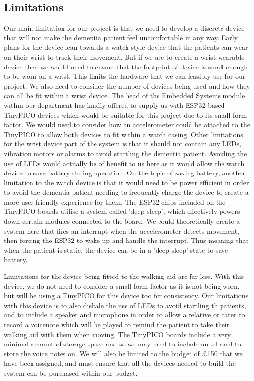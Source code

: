         \subsection{Limitations}
            Our main limitation for our project is that we need to develop a discrete device that will not make the dementia patient feel uncomfortable in any way. Early plans for the device lean towards a watch style device that the patients can wear on their wrist to track their movement. But if we are to create a wrist wearable device then we would need to ensure that the footprint of device is small enough to be worn on a wrist. This limits the hardware that we can feasibly use for our project. We also need to consider the number of devices being used and how they can all be fit within a wrist device. The head of the Embedded Systems module within our department has kindly offered to supply us with ESP32 based TinyPICO devices which would be suitable for this project due to its small form factor. We would need to consider how an accelerometer could be attached to the TinyPICO to allow both devices to fit within a watch casing. Other limitations for the wrist device part of the system is that it should not contain any LEDs, vibration motors or alarms to avoid startling the dementia patient. Avoiding the use of LEDs would actually be of benefit to us here as it would allow the watch device to save battery during operation. On the topic of saving battery, another limitation to the watch device is that it would need to be power efficient in order to avoid the dementia patient needing to frequently charge the device to create a more user friendly experience for them. The ESP32 chips included on the TinyPICO boards utilise a system called 'deep sleep', which effectively powers down certain modules connected to the board. We could theoretically create a system here that fires an interrupt when the accelerometer detects movement, then forcing the ESP32 to wake up and handle the interrupt. Thus meaning that when the patient is static, the device can be in a 'deep sleep' state to save battery.

            Limitations for the device being fitted to the walking aid are far less. With this device, we do not need to consider a small form factor as it is not being worn, but will be using a TinyPICO for this device too for consistency. Our limitations with this device is to also disbale the use of LEDs to avoid startling th patients, and to include a speaker and microphone in order to allow a relative or carer to record a voicenote which will be played to remind the patient to take their walking aid with them when moving. The TinyPICO boards include a very minimal amount of storage space and so we may need to include an sd card to store the voice notes on. We will also be limited to the budget of £150 that we have been assigned, and must ensure that all the devices needed to build the system can be purchased within our budget.

